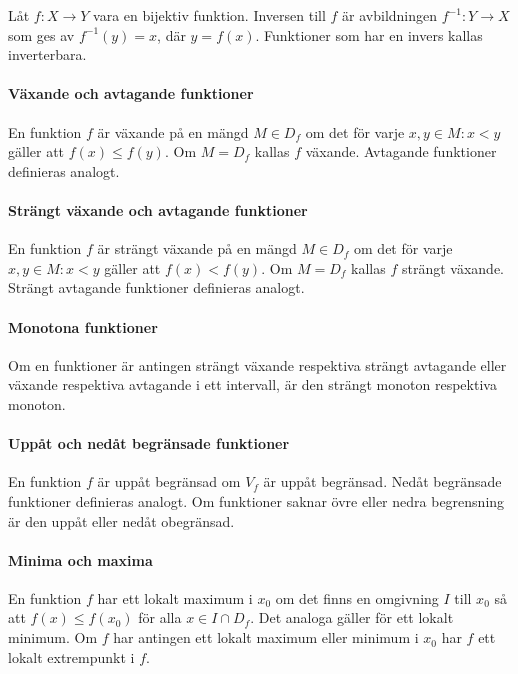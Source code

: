 Låt $f: X \to Y$ vara en bijektiv funktion. Inversen till $f$ är avbildningen $f^{-1}: Y\to X$ som ges av $f^{-1}(y)=x$, där $y=f(x)$. Funktioner som har en invers kallas inverterbara.

\paragraph{Växande och avtagande funktioner}

En funktion $f$ är växande på en mängd $M\in D_f$ om det för varje $x,y\in M: x<y$ gäller att $f(x)\leq f(y)$. Om $M=D_f$ kallas $f$ växande. Avtagande funktioner definieras analogt.

\paragraph{Strängt växande och avtagande funktioner}

En funktion $f$ är strängt växande på en mängd $M\in D_f$ om det för varje $x,y\in M: x<y$ gäller att $f(x)<f(y)$. Om $M=D_f$ kallas $f$ strängt växande. Strängt avtagande funktioner definieras analogt.

\paragraph{Monotona funktioner}

Om en funktioner är antingen strängt växande respektiva strängt avtagande eller växande respektiva avtagande i ett intervall, är den strängt monoton respektiva monoton.

\paragraph{Uppåt och nedåt begränsade funktioner}
En funktion $f$ är uppåt begränsad om $V_f$ är uppåt begränsad. Nedåt begränsade funktioner definieras analogt. Om funktioner saknar övre eller nedra begrensning är den uppåt eller nedåt obegränsad.

\paragraph{Minima och maxima}
En funktion $f$ har ett lokalt maximum i $x_0$ om det finns en omgivning $I$ till $x_0$ så att $f(x)\leq f(x_0)$ för alla $x\in I\cap D_f$. Det analoga gäller för ett lokalt minimum. Om $f$ har antingen ett lokalt maximum eller minimum i $x_0$ har $f$ ett lokalt extrempunkt i $f$.

